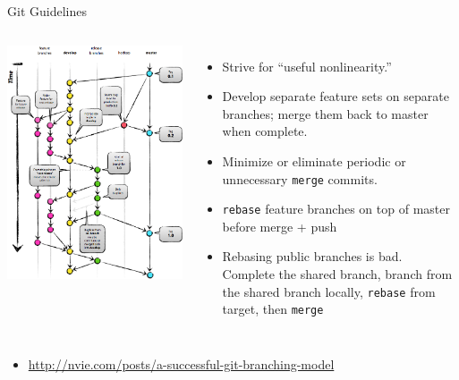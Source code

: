 \documentclass[mathserif]{beamer}
\begin{document}
\begin{frame}[fragile]{Git Guidelines}
  \begin{columns}
    \includegraphics[width=.8\textwidth]{git_branching}
    \begin{itemize}
    \item Strive for ``useful nonlinearity.''
    \item Develop separate feature sets on separate branches; merge them back to master when complete.
    \item Minimize or eliminate periodic or unnecessary \texttt{merge} commits.
    \item \texttt{rebase} feature branches on top of master before
        merge + push
    \item Rebasing public branches is bad\texttrademark.  Complete the
        shared branch, branch from the shared branch locally,
        \texttt{rebase} from target, then \texttt{merge}
    \end{itemize}
  \end{columns}
    \small
    \begin{itemize}
    \item \url{http://nvie.com/posts/a-successful-git-branching-model}
    \end{itemize}
\end{frame}
\end{document}
